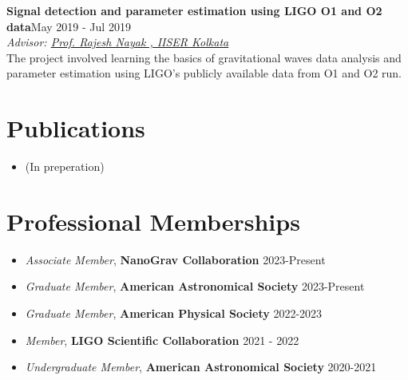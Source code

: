 \documentclass[margin, centered]{res}
\begin{document}
\begin{resume}
\textbf{Signal detection and parameter estimation using LIGO O1 and O2 data}\hfill May 2019 - Jul 2019 \\
\emph{Advisor: \href{https://www.iiserkol.ac.in/~rajesh/}{Prof. Rajesh Nayak , IISER Kolkata}}
\vspace{0.1 cm}\\
The project involved learning the basics of gravitational waves data analysis and parameter estimation using LIGO's publicly available data from O1 and O2 run.






\section{Publications}
\begin{itemize}[leftmargin=*]
    \item (In preperation) 
\end{itemize}






\section{Professional Memberships}
\begin{itemize}[leftmargin=*]
    \item \textit{Associate Member}, \textbf{\color{C3} NanoGrav Collaboration} \hfill 2023-Present
    \item \textit{Graduate Member}, \textbf{\color{C3} American Astronomical Society} \hfill 2023-Present
    \item \textit{Graduate Member}, \textbf{\color{C3} American Physical Society} \hfill 2022-2023
    \item \textit{Member}, \textbf{\color{C3} LIGO Scientific Collaboration} \hfill 2021 -   2022
    \item \textit{Undergraduate Member}, \textbf{\color{C3} American Astronomical Society} \hfill 2020-2021
\end{itemize}


\end{resume}
\end{document}
